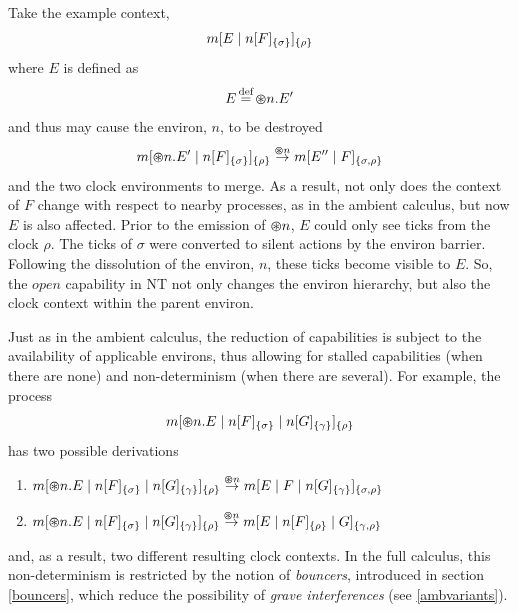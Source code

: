 Take the example context,
\begin{equation}
{m}[ E\;|\;{n}[ F ]_{\{\sigma\}} ]_{\{\rho\}}
\end{equation}
where $E$ is defined as
\begin{equation}
E \operatorname{\stackrel{\textrm{def}}{=}} \varoast n.E^\prime
\end{equation}
and thus may cause the environ, $n$, to be destroyed
\begin{equation}
{m}[ \varoast n.E^\prime \;|\;{n}[ F ]_{\{\sigma\}} ]_{\{\rho\}} \stackrel{\varoast n}{\rightarrow}
{m}[ E'^\prime\;|\;F ]_{\{\sigma, \rho\}}
\end{equation}
and the two clock environments to merge.  As a result, not
only does the context of $F$ change with respect to nearby processes, as
in the ambient calculus, but now $E$ is also affected.  Prior to the
emission of $\varoast n$, $E$ could only see ticks from the clock
$\rho$.  The ticks of $\sigma$ were converted to silent actions by the
environ barrier.  Following the dissolution of the environ, $n$, these
ticks become visible to $E$.  So, the $open$ capability in NT not only
changes the environ hierarchy, but also the clock context within the
parent environ.

Just as in the ambient calculus, the reduction of capabilities is
subject to the availability of applicable environs, thus allowing for
stalled capabilities (when there are none) and non-determinism (when
there are several). For example, the process
\begin{equation}
{m}[ \varoast n.E\;|\;{n}[ F ]_{\{\sigma\}}\;|\;{n}[ G ]_{\{\gamma\}} ]_{\{\rho\}}
\end{equation}
has two possible derivations

\begin{enumerate}
\item
      ${m}[ \varoast n.E\;|\;{n}[ F ]_{\{\sigma\}}\;|\;{n}[ G ]_{\{\gamma\}} ]_{\{\rho\}}
      \stackrel{\varoast n}{\rightarrow} {m}[ E \;|\; F \;|\;
      {n}[ G ]_{\{\gamma\}} ]_{\{\sigma , \rho\}}$
\item
      ${m}[ \varoast n.E\;|\;{n}[ F ]_{\{\sigma\}}\;|\;{n}[ G ]_{\{\gamma\}} ]_{\{\rho\}}
      \stackrel{\varoast n}{\rightarrow} {m}[ E \;|\; {n}[ F ]_{\{\rho\}} \;|\; G ]_{\{\gamma , \rho\}}$
\end{enumerate}
and, as a result, two different resulting clock contexts.  In
the full calculus, this non-determinism is restricted by the notion of
\emph{bouncers}, introduced in section \ref{bouncers}, which reduce the possibility of \emph{grave interferences} (see \ref{ambvariants}).  

